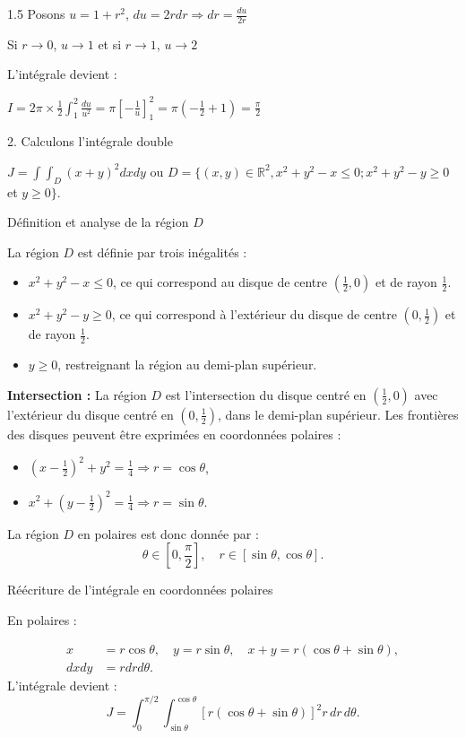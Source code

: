 \documentclass[12pt]{article}
\begin{document}
\begin{spacing}{1.5}
Posons $u=1+r^2$, $du=2rdr\Longrightarrow dr=\frac{du}{2r}$

Si $r\to 0$, $u\to 1$ et si  $r\to 1$, $u\to 2$

L'intégrale devient :

$I=2\pi\times\frac{1}{2}\int_1^2\frac{du}{u^2}=\pi[-\frac{1}{u}]_1^2=\pi(-\frac{1}{2}+1)=\frac{\pi}{2}$


2. Calculons l'intégrale double

$J=\int\int_D(x+y)^2dxdy$ ou $D=\lbrace (x,y)\in \mathbb{R}^2, x^2+y^2-x \leq 0;x^2+y^2-y \geq 0$ et $y \geq 0 \rbrace$.

 Définition et analyse de la région \(D\)
 
La région \(D\) est définie par trois inégalités :
\begin{itemize}
    \item \( x^2 + y^2 - x \leq 0 \), ce qui correspond au disque de centre \(\left( \frac{1}{2}, 0 \right)\) et de rayon \(\frac{1}{2}\).
    \item \( x^2 + y^2 - y \geq 0 \), ce qui correspond à l'extérieur du disque de centre \((0, \frac{1}{2})\) et de rayon \(\frac{1}{2}\).
    \item \( y \geq 0 \), restreignant la région au demi-plan supérieur.
\end{itemize}

\textbf{Intersection :} La région \(D\) est l'intersection du disque centré en \(\left( \frac{1}{2}, 0 \right)\) avec l'extérieur du disque centré en \((0, \frac{1}{2})\), dans le demi-plan supérieur. Les frontières des disques peuvent être exprimées en coordonnées polaires :
\begin{itemize}
    \item \( (x - \frac{1}{2})^2 + y^2 = \frac{1}{4} \Rightarrow r = \cos\theta \),
    \item \( x^2 + (y - \frac{1}{2})^2 = \frac{1}{4} \Rightarrow r = \sin\theta \).
\end{itemize}
La région \(D\) en polaires est donc donnée par :
\[ \theta \in [0, \frac{\pi}{2}], \quad r \in [\sin\theta, \cos\theta]. \]

 Réécriture de l'intégrale en coordonnées polaires
 
En polaires :

\begin{align*}
    x &= r\cos\theta, \quad y = r\sin\theta, \quad x + y = r(\cos\theta + \sin\theta), \\
    dxdy &= r drd\theta.
\end{align*}
L'intégrale devient :
\[
    J = \int_0^{\pi/2} \int_{\sin\theta}^{\cos\theta} \left[r(\cos\theta + \sin\theta)\right]^2 r \, dr \, d\theta.
\]


\end{spacing}
\end{document}
